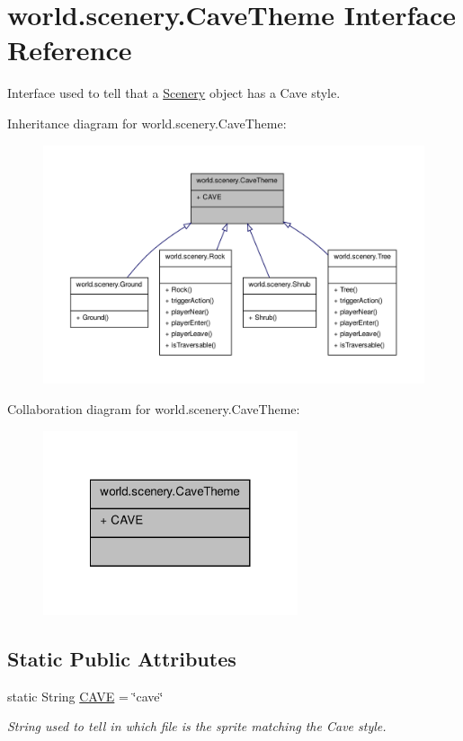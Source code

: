 \hypertarget{a00004}{\section{world.\-scenery.\-Cave\-Theme Interface Reference}
\label{a00004}
}


Interface used to tell that a \hyperlink{a00024}{Scenery} object has a Cave style.  




Inheritance diagram for world.\-scenery.\-Cave\-Theme\-:
\nopagebreak
\begin{figure}[H]
\begin{center}
\leavevmode
\includegraphics[width=350pt]{a00155}
\end{center}
\end{figure}


Collaboration diagram for world.\-scenery.\-Cave\-Theme\-:
\nopagebreak
\begin{figure}[H]
\begin{center}
\leavevmode
\includegraphics[width=212pt]{a00156}
\end{center}
\end{figure}
\subsection*{Static Public Attributes}
\begin{DoxyCompactItemize}
\item 
static String \hyperlink{a00004_abbad3655c1d1f230dddfd7ecc5194f50}{C\-A\-V\-E} = \char`\"{}cave\char`\"{}
\begin{DoxyCompactList}\small\item\em String used to tell in which file is the sprite matching the Cave style. \end{DoxyCompactList}\end{DoxyCompactItemize}


